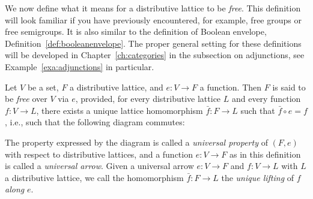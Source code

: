   
We now define what it means for a distributive lattice to be \emph{free}. This definition will look familiar if you have previously encountered, for example, free groups or free semigroups. It is also similar to the definition of Boolean envelope, Definition~\ref{def:booleanenvelope}. The proper general setting for these definitions will be developed in Chapter~\ref{ch:categories} in the subsection on adjunctions, see Example~\ref{exa:adjunctions} in particular.
  \begin{definition}
  Let $V$ be a set, $F$ a distributive lattice, and $e \colon V \to F$ a function. Then $F$ is said to be \emph{free} over $V$ via $e$, provided, for every distributive lattice $L$ and every function $f \colon V \to L$, there exists a unique lattice homomorphism $\bar{f} \colon F \to L$ such that $\bar{f} \circ e = f$, i.e., such that the following diagram commutes:
  \begin{center}
  \end{center}
  \end{definition}
  The property expressed by the diagram is called a \emph{universal property} of $(F,e)$ with respect to distributive lattices, and a function $e \colon V \to F$ as in this definition is called a \emph{universal arrow}. Given a universal arrow $e \colon V \to F$ and $f \colon V \to L$ with $L$ a distributive lattice, we call the homomorphism $\bar{f} \colon F \to L$ the \emph{unique lifting} of $f$ \emph{along} $e$.
  
